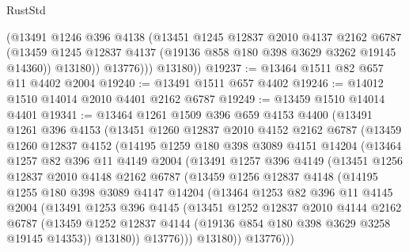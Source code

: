 \begin{lexlean}{RustStd}
\begin{coremodule}
              (@13491
                @1246
                @396
                @4138
                (@13451
                  @1245
                  @12837
                  @2010
                  @4137
                  @2162
                  @6787
                  (@13459 @1245 @12837 @4137 (@19136 @858 @180 @398 @3629 @3262 @19145 @14360))
                  @13180))
              @13776)))
        @13180))
@19237 := @13464 @1511 @82 @657 @11 @4402 @2004
@19240 := @13491 @1511 @657 @4402
@19246 := @14012 @1510 @14014 @2010 @4401 @2162 @6787
@19249 := @13459 @1510 @14014 @4401
@19341 := @13464
    @1261
    @1509
    @396
    @659
    @4153
    @4400
    (@13491
      @1261
      @396
      @4153
      (@13451
        @1260
        @12837
        @2010
        @4152
        @2162
        @6787
        (@13459
          @1260
          @12837
          @4152
          (@14195
            @1259
            @180
            @398
            @3089
            @4151
            @14204
            (@13464
              @1257
              @82
              @396
              @11
              @4149
              @2004
              (@13491
                @1257
                @396
                @4149
                (@13451
                  @1256
                  @12837
                  @2010
                  @4148
                  @2162
                  @6787
                  (@13459
                    @1256
                    @12837
                    @4148
                    (@14195
                      @1255
                      @180
                      @398
                      @3089
                      @4147
                      @14204
                      (@13464
                        @1253
                        @82
                        @396
                        @11
                        @4145
                        @2004
                        (@13491
                          @1253
                          @396
                          @4145
                          (@13451
                            @1252
                            @12837
                            @2010
                            @4144
                            @2162
                            @6787
                            (@13459
                              @1252
                              @12837
                              @4144
                              (@19136 @854 @180 @398 @3629 @3258 @19145 @14353))
                            @13180))
                        @13776)))
                  @13180))
              @13776)))

\end{coremodule}
\end{lexlean}
